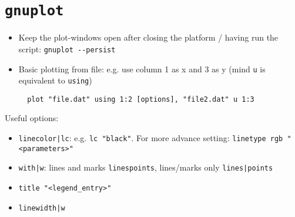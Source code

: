 \documentclass[a4paper,12pt,%
              final%
              ]{article}
\begin{document}
\section{\texttt{gnuplot}}
\begin{itemize}
  \item Keep the plot-windows open after closing the platform / having run the script: \verb|gnuplot --persist|
  \item Basic plotting from file: e.g. use column 1 as x and 3 as y (mind \texttt{u} is equivalent to \texttt{using})
\begin{verbatim}
  plot "file.dat" using 1:2 [options], "file2.dat" u 1:3
\end{verbatim}
\end{itemize}
Useful options:
\begin{itemize}
  \item \verb!linecolor|lc!: e.g. \verb|lc "black"|. For more advance setting: \verb|linetype rgb "<parameters>"|
  \item \verb!with|w!: lines and marks \verb|linespoints|, lines/marks only \verb!lines|points!
  \item \verb|title "<legend_entry>"|
  \item \verb!linewidth|w!
\end{itemize}
\end{document}
